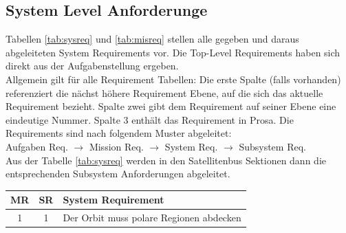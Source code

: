\documentclass[twoside]{article}
\begin{document}
\begin{multicols}{2}
      \subsection{System Level Anforderunge}
      Tabellen \ref{tab:sysreq} und \ref{tab:misreq} stellen alle
      gegeben und daraus abgeleiteten System Requirements vor. Die Top-Level Requirements haben sich direkt aus der Aufgabenstellung ergeben.\\
%
      Allgemein gilt für alle Requirement Tabellen: Die erste Spalte 
      (falls vorhanden) referenziert die nächst höhere Requirement Ebene, auf die sich das aktuelle Requirement bezieht. Spalte zwei gibt dem Requirement auf seiner Ebene eine eindeutige Nummer. Spalte 3 enthält das Requirement in Prosa. Die Requirements sind nach folgendem Muster abgeleitet:\\
      Aufgaben Req. $\longrightarrow$ Mission Req. $\longrightarrow$ System Req. $\longrightarrow$ Subsystem Req.\\
      Aus der Tabelle \ref{tab:sysreq} werden in den Satellitenbus Sektionen dann die entsprechenden Subsystem Anforderungen abgeleitet.
      \begin{table}[H]
         \centering
         \begin{tabular}{ccl}
            \toprule  
            MR & SR & System Requirement \\
            \midrule
            1 & 1 & \parbox[t]{5cm}{Der Orbit muss polare Regionen abdecken }  \\

\end{tabular}
\end{table}
\end{multicols}
\end{document}
